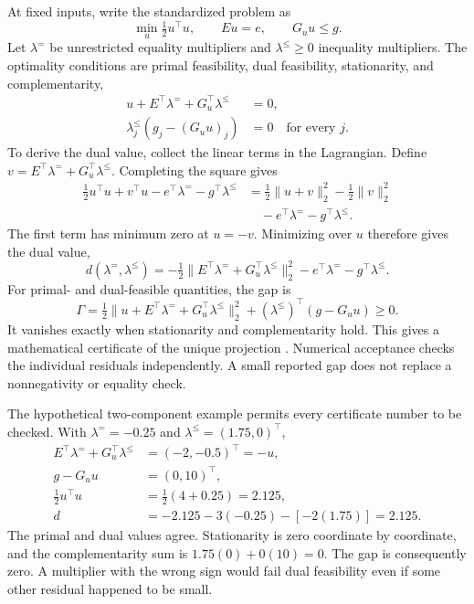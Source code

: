 At fixed inputs, write the standardized problem as
\begin{equation}
\min_u\tfrac12u^\top u,\qquad Eu=e,\qquad G_uu\le g.
\label{eq:plant_standard_projection}
\end{equation}
Let $\lambda^=$ be unrestricted equality multipliers and $\lambda^\le\ge0$ inequality multipliers. The optimality conditions are primal feasibility, dual feasibility, stationarity, and complementarity,
\begin{align}
u+E^\top\lambda^=+G_u^\top\lambda^\le&=0,\\
\lambda^\le_j(g_j-(G_uu)_j)&=0\quad\text{for every }j.
\label{eq:plant_projection_optimality}
\end{align}
To derive the dual value, collect the linear terms in the Lagrangian. Define $v=E^\top\lambda^=+G_u^\top\lambda^\le$. Completing the square gives
\begin{align}
\tfrac12u^\top u+v^\top u-e^\top\lambda^=-g^\top\lambda^\le
&=\tfrac12\|u+v\|_2^2-\tfrac12\|v\|_2^2\\
&\quad-e^\top\lambda^=-g^\top\lambda^\le.
\end{align}
The first term has minimum zero at $u=-v$. Minimizing over $u$ therefore gives the dual value,
\begin{equation}
d(\lambda^=,\lambda^\le)=
-\tfrac12\|E^\top\lambda^=+G_u^\top\lambda^\le\|_2^2
-e^\top\lambda^=-g^\top\lambda^\le.
\end{equation}
For primal- and dual-feasible quantities, the gap is
\begin{equation}
\Gamma=\tfrac12\|u+E^\top\lambda^=+G_u^\top\lambda^\le\|_2^2
+(\lambda^\le)^\top(g-G_uu)\ge0.
\label{eq:plant_projection_gap}
\end{equation}
It vanishes exactly when stationarity and complementarity hold. This gives a mathematical certificate of the unique projection \citep{Boyd2004}. Numerical acceptance checks the individual residuals independently. A small reported gap does not replace a nonnegativity or equality check.

The hypothetical two-component example permits every certificate number to be checked. With $\lambda^{=}=-0.25$ and $\lambda^\le=(1.75,0)^\top$,
\begin{align}
E^\top\lambda^=+G_u^\top\lambda^\le&=(-2,-0.5)^\top=-u,\\
g-G_uu&=(0,10)^\top,\\
\tfrac12u^\top u&=\tfrac12(4+0.25)=2.125,\\
d&=-2.125-3(-0.25)-[-2(1.75)]=2.125.
\end{align}
The primal and dual values agree. Stationarity is zero coordinate by coordinate, and the complementarity sum is $1.75(0)+0(10)=0$. The gap is consequently zero. A multiplier with the wrong sign would fail dual feasibility even if some other residual happened to be small.

